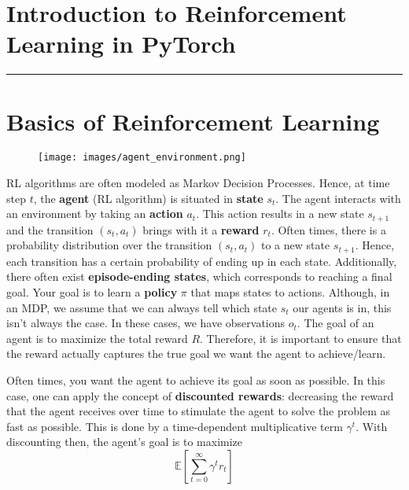 \documentclass[12pt,letterpaper, onecolumn]{exam}
\newcommand{\highlight}[1]{\textbf{\textcolor{highlight_color}{#1}}}
\begin{document}
\section*{Introduction to Reinforcement Learning in PyTorch\cite{medium}}
\rule{\textwidth}{0.4pt}

\section{Basics of Reinforcement Learning}
\begin{figure}[h]
    \centering
    \caption{\cite{agent_env}}
    \texttt{[image: images/agent\_environment.png]}
\end{figure}
RL algorithms are often modeled as Markov Decision Processes. Hence, at time step $t$, the \highlight{agent} (RL algorithm) is situated in \highlight{state} $s_t$. The agent interacts with an environment by taking an \highlight{action} $a_t$. This action results in a new state $s_{t+1}$ and the transition $(s_t, a_t)$ brings with it a \highlight{reward} $r_t$.
Often times, there is a probability distribution over the transition $(s_t, a_t)$ to a new state $s_{t+1}$. Hence, each transition has a certain probability of ending up in each state. Additionally, there often exist \highlight{episode-ending states}, which corresponds to reaching a final goal. Your goal is to learn a \highlight{policy} $\pi$ that maps states to actions. Although, in an MDP, we assume that we can always tell which state $s_t$ our agents is in, this isn't always the case. In these cases, we have observations $o_t$. The goal of an agent is to maximize the total reward $R$. Therefore, it is important to ensure that the reward actually captures the true goal we want the agent to achieve/learn. 

Often times, you want the agent to achieve its goal as soon as possible. In this case, one can apply the concept of \highlight{discounted rewards}: decreasing the reward that the agent receives over time to stimulate the agent to solve the problem as fast as possible. This is done by a time-dependent multiplicative term $\gamma^t$. With discounting then, the agent's goal is to maximize
\begin{equation}
  \mathbb{E}[\sum_{t=0}^\infty \gamma^t r_t]
\end{equation}
\end{document}
